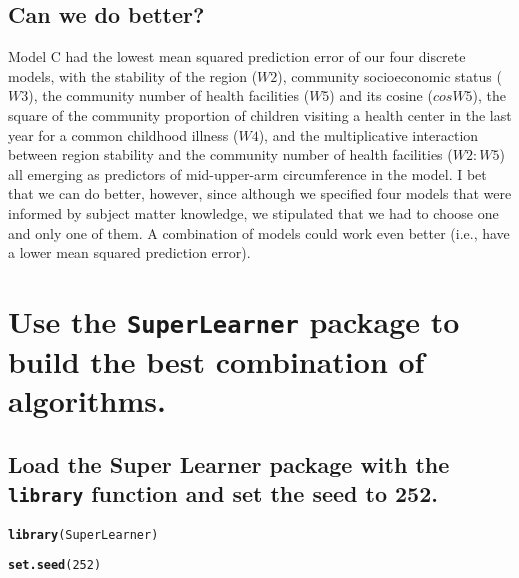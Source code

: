 \documentclass{article}\usepackage[]{graphicx}\usepackage[]{xcolor}
\makeatletter
\newcommand{\hlnum}[1]{\textcolor[rgb]{0.686,0.059,0.569}{#1}}%
\newcommand{\hlstd}[1]{\textcolor[rgb]{0.345,0.345,0.345}{#1}}%
\newcommand{\hlkwd}[1]{\textcolor[rgb]{0.737,0.353,0.396}{\textbf{#1}}}%
\newenvironment{kframe}{%
 \def\at@end@of@kframe{}%
 \ifinner\ifhmode%
  \def\at@end@of@kframe{\end{minipage}}%
  \begin{minipage}{\columnwidth}%
 \fi\fi%
 \def\FrameCommand##1{\hskip\@totalleftmargin \hskip-\fboxsep
 \colorbox{shadecolor}{##1}\hskip-\fboxsep
     \hskip-\linewidth \hskip-\@totalleftmargin \hskip\columnwidth}%
 \MakeFramed {\advance\hsize-\width
   \@totalleftmargin\z@ \linewidth\hsize
   \@setminipage}}%
 {\par\unskip\endMakeFramed%
 \at@end@of@kframe}
\newenvironment{knitrout}{}{} %
\makeatother
\begin{document}
  \subsection{Can we do better?}
  
Model C had the lowest mean squared prediction error of our four discrete models, with the stability of the region ($W2$), community socioeconomic status ($W3$), the community number of health facilities ($W5$) and its cosine ($cosW5$), the square of the community proportion of children visiting a health center in the last year for a common childhood illness ($W4$), and the multiplicative interaction between region stability and the community number of health facilities ($W2:W5$) all emerging as predictors of mid-upper-arm circumference in the model. I bet that we can do better, however, since although we specified four models that were informed by subject matter knowledge, we stipulated that we had to choose one and only one of them. A combination of models could work even better (i.e., have a lower mean squared prediction error).
  
\section{Use the \texttt{SuperLearner} package to build the best combination of algorithms.}

  \subsection{Load the Super Learner package with the \texttt{library} function and set the seed to 252.}
  
\begin{knitrout}
\color{fgcolor}\begin{kframe}
\begin{alltt}
\hlkwd{library}\hlstd{(SuperLearner)}
\end{alltt}


{\ttfamily\noindent\color{warningcolor}{\#\# Warning: package 'SuperLearner' was built under R version 3.6.3}}

{\ttfamily\noindent\itshape\color{messagecolor}{\#\# Loading required package: nnls}}

{\ttfamily\noindent\itshape\color{messagecolor}{\#\# Super Learner}}

{\ttfamily\noindent\itshape\color{messagecolor}{\#\# Version: 2.0-26}}

{\ttfamily\noindent\itshape\color{messagecolor}{\#\# Package created on 2019-10-27}}\begin{alltt}
\hlkwd{set.seed}\hlstd{(}\hlnum{252}\hlstd{)}
\end{alltt}
\end{kframe}
\end{knitrout}
\end{document}
